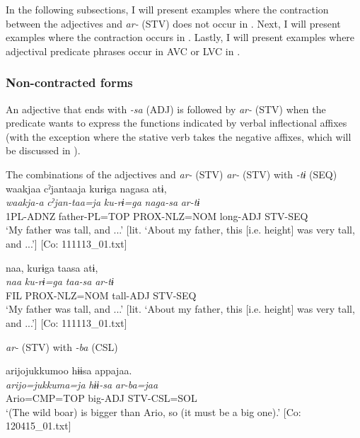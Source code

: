   In the following subsections, I will present examples where the contraction between the adjectives and \textit{ar-} (STV) does not occur in . Next, I will present examples where the contraction occurs in . Lastly, I will present examples where adjectival predicate phrases occur in AVC or LVC in .

\subsubsection{Non-contracted forms}\label{sec:9.2.2.1}
\label{bkm:Ref361739107}
An adjective that ends with \textit{{}-sa} (ADJ) is followed by \textit{ar-} (STV) when the predicate wants to express the functions indicated by verbal inflectional affixes (with the exception where the stative verb takes the negative affixes, which will be discussed in ).

\ea   The combinations of the adjectives and \textit{ar-} (STV) \label{ex:9.45}
\exi{}  \textit{ar-} (STV) with \textit{{}-tɨ} (SEQ)
\ea %
 \glll  waakjaa  cˀjantaaja  kurɨga  nagasa  atɨ,\\
      \textit{waakja-a}  \textit{cˀjan-taa=ja}  \textit{ku-rɨ=ga}  \textit{naga-sa}  \textit{ar-tɨ}\\
      1PL-ADNZ  father-PL=TOP  PROX-NLZ=NOM  long-ADJ  STV-SEQ\\
      \glt       ‘My father was tall, and ...’ [lit. ‘About my father, this [i.e. height] was very tall, and ...’] [Co: 111113\_01.txt]

\ex \label{ex:9.45b} %
    \glll  naa,  kurɨga  taasa  atɨ,\\
      \textit{naa}  \textit{ku-rɨ=ga}  \textit{taa-sa}  \textit{ar-tɨ}\\
      FIL  PROX-NLZ=NOM  tall-ADJ  STV-SEQ\\
      \glt       ‘My father was tall, and ...’ [lit. ‘About my father, this [i.e. height] was very tall, and ...’] [Co: 111113\_01.txt]

\exi{} \textit{ar-} (STV) with \textit{{}-ba} (CSL)

\ex \label{ex:9.45c} %
    \glll  arijojukkumoo  hɨɨsa  appajaa.\\
      \textit{arijo=jukkuma=ja}  \textit{hɨɨ-sa}  \textit{ar-ba=jaa}\\
      Ario=CMP=TOP  big-ADJ  STV-CSL=SOL\\
      \glt       ‘(The wild boar) is bigger than Ario, so (it must be a big one).’ [Co: 120415\_01.txt]

